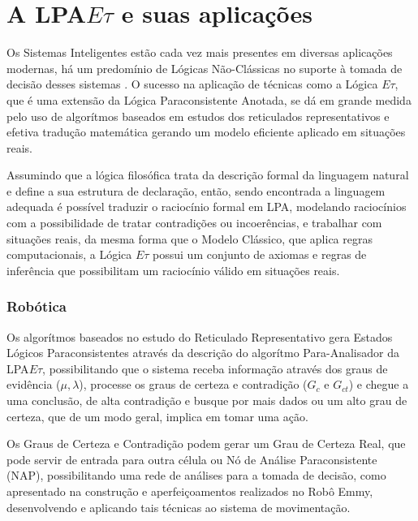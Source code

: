 \section{A LPA$E\tau$ e suas aplicações}

Os Sistemas Inteligentes estão cada vez mais presentes em diversas
aplicações modernas, há um predomínio de
Lógicas Não-Clássicas no suporte à tomada de decisão desses sistemas \cite{JISF2011}. O sucesso na aplicação de técnicas como a Lógica $E\tau$, que é uma extensão da Lógica Paraconsistente Anotada, se dá em grande medida pelo uso de algorítmos baseados em estudos dos reticulados representativos e efetiva tradução matemática gerando um modelo eficiente aplicado em situações reais.

Assumindo que a lógica filosófica trata da descrição formal da linguagem natural e define a sua estrutura de declaração, então, sendo encontrada a linguagem adequada é possível traduzir o raciocínio formal em LPA, modelando raciocínios com a possibilidade de tratar contradições ou incoerências, e trabalhar com situações reais, da mesma forma que o Modelo Clássico, que aplica regras computacionais, a Lógica $E\tau$ possui um conjunto de axiomas e regras de inferência que possibilitam um raciocínio válido em situações reais.


\subsubsection{Robótica}

Os algorítmos baseados no estudo do Reticulado Representativo gera Estados Lógicos Paraconsistentes através da descrição do algorítmo Para-Analisador da LPA$E\tau$, possibilitando que o sistema receba informação através dos graus de evidência ($\mu, \lambda$), processe os graus de certeza e contradição ($G_c$ e $G_{ct}$) e chegue a uma conclusão, de alta contradição e busque por mais dados ou um alto grau de certeza, que de um modo geral, implica em tomar uma ação. 

Os Graus de Certeza e Contradição podem gerar um Grau de Certeza Real, que pode servir de entrada para outra célula ou Nó de Análise Paraconsistente (NAP), possibilitando uma rede de análises para a tomada de decisão, como apresentado na construção e aperfeiçoamentos realizados no Robô Emmy, \cite{JoaoInacio}\cite{ClaudioRodrigoTorres} desenvolvendo e aplicando tais técnicas ao sistema de movimentação.


